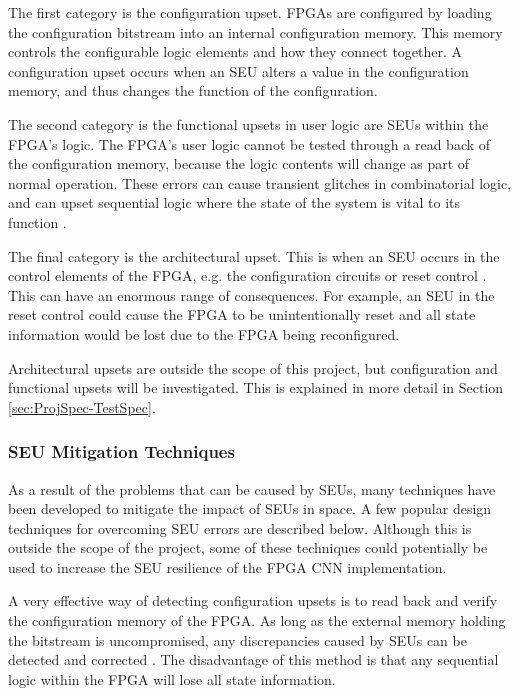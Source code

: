 \documentclass[12pt]{article}
\begin{document}
The first category is the configuration upset. FPGAs are configured by loading the configuration bitstream into an internal configuration memory. This memory controls the configurable logic elements and how they connect together. A configuration upset occurs when an SEU alters a value in the configuration memory, and thus changes the function of the configuration. 

The second category is the functional upsets in user logic are SEUs within the FPGA's logic. The FPGA's user logic cannot be tested through a read back of the configuration memory, because the logic contents will change as part of normal operation. These errors can cause transient glitches in combinatorial logic, and can upset sequential logic where the state of the system is vital to its function \cite{FTripleMR}.

The final category is the architectural upset. This is when an SEU occurs in the control elements of the FPGA, e.g. the configuration circuits or reset control \cite{SuitabilityGaisler}. This can have an enormous range of consequences. For example, an SEU in the reset control could cause the FPGA to be unintentionally reset and all state information would be lost due to the FPGA being reconfigured.

Architectural upsets are outside the scope of this project, but configuration and functional upsets will be investigated. This is explained in more detail in Section \ref{sec:ProjSpec-TestSpec}.

\subsubsection{SEU Mitigation Techniques}
\label{sec:Background-FPGAsAndSpaceApplications-Mitigation}

As a result of the problems that can be caused by SEUs, many techniques have been developed to mitigate the impact of SEUs in space. A few popular design techniques for overcoming SEU errors are described below. Although this is outside the scope of the project, some of these techniques could potentially be used to increase the SEU resilience of the FPGA CNN implementation.

A very effective way of detecting configuration upsets is to read back and verify the configuration memory of the FPGA. As long as the external memory holding the bitstream is uncompromised, any discrepancies caused by SEUs can be detected and corrected \cite{SuitabilityGaisler}. The disadvantage of this method is that any sequential logic within the FPGA will lose all state information.
\end{document}
